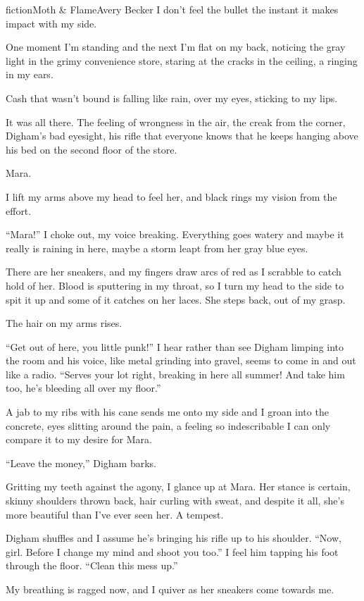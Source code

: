 \begin{prose}{fiction}{Moth \& Flame}{Avery Becker}
I don't feel the bullet the instant it makes impact with my side. \par
One moment I'm standing and the next I'm flat on my back, noticing the gray light in the grimy convenience store, staring at the cracks in the ceiling, a ringing in my ears.\par
Cash that wasn't bound is falling like rain, over my eyes, sticking to my lips. \par
It was all there. The feeling of wrongness in the air, the creak from the corner, Digham's bad eyesight, his rifle that everyone knows that he keeps hanging above his bed on the second floor of the store. \par
Mara. \par
I lift my arms above my head to feel her, and black rings my vision from the effort. \par
“Mara!” I choke out, my voice breaking. Everything goes watery and maybe it really is raining in here, maybe a storm leapt from her gray blue eyes. \par
There are her sneakers, and my fingers draw arcs of red as I scrabble to catch hold of her. Blood is sputtering in my throat, so I turn my head to the side to spit it up and some of it catches on her laces. She steps back, out of my grasp. \par
The hair on my arms rises.\par
“Get out of here, you little punk!” I hear rather than see Digham limping into the room and his voice, like metal grinding into gravel, seems to come in and out like a radio. “Serves your lot right, breaking in here all summer! And take him too, he's bleeding all over my floor.” \par
A jab to my ribs with his cane sends me onto my side and I groan into the concrete, eyes slitting around the pain, a feeling so indescribable I can only compare it to my desire for Mara.\par
“Leave the money,” Digham barks. \par
Gritting my teeth against the agony, I glance up at Mara. Her stance is certain, skinny shoulders thrown back, hair curling with sweat, and despite it all, she's more beautiful than I've ever seen her. A tempest.\par
Digham shuffles and I assume he's bringing his rifle up to his shoulder. “Now, girl. Before I change my mind and shoot you too.” I feel him tapping his foot through the floor. “Clean this mess up.” \par
My breathing is ragged now, and I quiver as her sneakers come towards me.\par

\end{prose}

